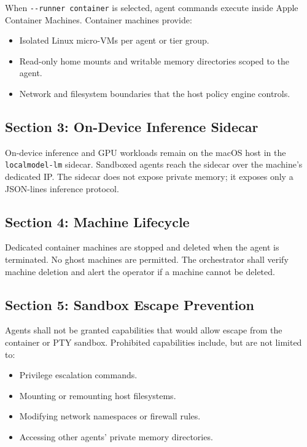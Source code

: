 \documentclass[12pt,letterpaper]{article}
\begin{document}
When \texttt{-{}-runner container} is selected, agent commands execute inside Apple Container Machines. Container machines provide:

\begin{itemize}
    \item Isolated Linux micro-VMs per agent or tier group.
    \item Read-only home mounts and writable memory directories scoped to the agent.
    \item Network and filesystem boundaries that the host policy engine controls.
\end{itemize}

\subsection{Section 3: On-Device Inference Sidecar}

On-device inference and GPU workloads remain on the macOS host in the \texttt{localmodel-lm} sidecar. Sandboxed agents reach the sidecar over the machine's dedicated IP. The sidecar does not expose private memory; it exposes only a JSON-lines inference protocol.

\subsection{Section 4: Machine Lifecycle}

Dedicated container machines are stopped and deleted when the agent is terminated. No ghost machines are permitted. The orchestrator shall verify machine deletion and alert the operator if a machine cannot be deleted.

\subsection{Section 5: Sandbox Escape Prevention}

Agents shall not be granted capabilities that would allow escape from the container or PTY sandbox. Prohibited capabilities include, but are not limited to:

\begin{itemize}
    \item Privilege escalation commands.
    \item Mounting or remounting host filesystems.
    \item Modifying network namespaces or firewall rules.
    \item Accessing other agents' private memory directories.
\end{itemize}
\end{document}
